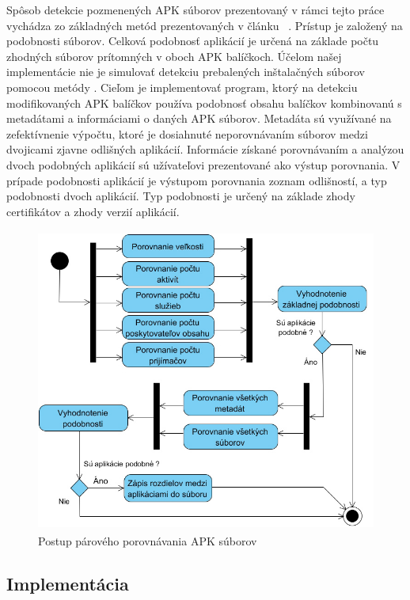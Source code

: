 Spôsob detekcie pozmenených APK súborov prezentovaný v rámci tejto práce vychádza zo základných metód prezentovaných v článku ~\cite{Zhauniarovich2014}. Prístup je založený na podobnosti súborov. Celková podobnosť aplikácií je určená na základe počtu zhodných súborov prítomných v oboch APK balíčkoch. Účelom našej implementácie nie je simulovať detekciu prebalených inštalačných súborov pomocou metódy . Cieľom je implementovať program, ktorý na detekciu modifikovaných APK balíčkov používa podobnosť obsahu balíčkov kombinovanú s metadátami a informáciami o daných APK súborov. Metadáta sú využívané na zefektívnenie výpočtu, ktoré je dosiahnuté neporovnávaním súborov medzi dvojicami zjavne odlišných aplikácií. Informácie získané porovnávaním a analýzou dvoch podobných aplikácií sú užívateľovi prezentované ako výstup porovnania. V prípade podobnosti aplikácií je výstupom porovnania zoznam odlišností, a typ podobnosti dvoch aplikácií. Typ podobnosti je určený na základe zhody certifikátov a zhody verzií aplikácií. 
\begin{figure}[htb]
  \begin{center}
    \includegraphics[height=10cm]{images/diagram.jpg}
  \end{center}
  \caption{Postup párového porovnávania APK súborov}
  \label{fig:compareFlow}
\end{figure}
\subsection{Implementácia}

